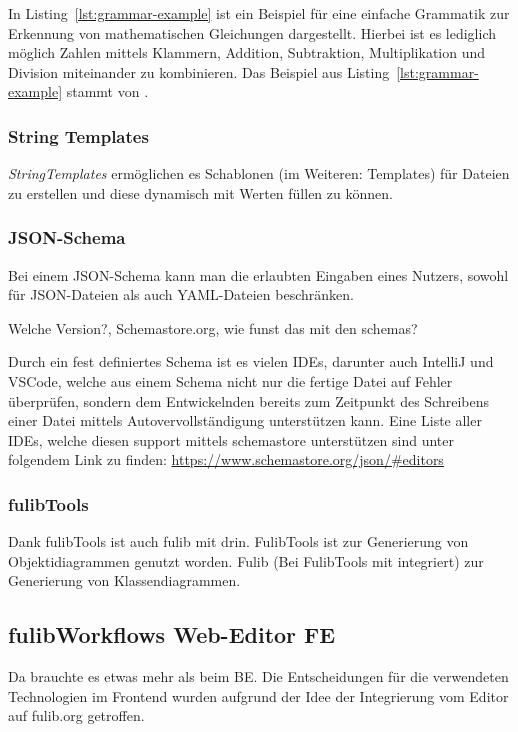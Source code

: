 

In Listing~\ref{lst:grammar-example} ist ein Beispiel für eine einfache Grammatik zur Erkennung von mathematischen Gleichungen dargestellt.
Hierbei ist es lediglich möglich Zahlen mittels Klammern, Addition, Subtraktion, Multiplikation und Division miteinander zu kombinieren.
Das Beispiel aus Listing~\ref{lst:grammar-example} stammt von \cite{antlrOrg}.

\subsubsection{String Templates}
\textit{StringTemplates} ermöglichen es Schablonen (im Weiteren: Templates) für Dateien zu erstellen und diese dynamisch mit Werten füllen zu können.


\subsubsection{JSON-Schema}\label{subsubsec:json-schema}
Bei einem JSON-Schema kann man die erlaubten Eingaben eines Nutzers, sowohl für JSON-Dateien als
auch YAML-Dateien beschränken.

\todo Welche Version?, Schemastore.org, wie funst das mit den schemas?

Durch ein fest definiertes Schema ist es vielen IDEs, darunter auch IntelliJ und VSCode, welche
aus einem Schema nicht nur die fertige Datei auf Fehler überprüfen, sondern dem Entwickelnden bereits
zum Zeitpunkt des Schreibens einer Datei mittels Autovervollständigung unterstützen kann.
Eine Liste aller IDEs, welche diesen support mittels schemastore unterstützen sind unter folgendem
Link zu finden: \url{https://www.schemastore.org/json/#editors}

\subsubsection{fulibTools}
\todo
Dank fulibTools ist auch fulib mit drin.
FulibTools ist zur Generierung von Objektidiagrammen genutzt worden.
Fulib (Bei FulibTools mit integriert) zur Generierung von Klassendiagrammen.

\subsection{fulibWorkflows Web-Editor FE}\label{subsec:fulibworkflows-web-editor}
\todo
Da brauchte es etwas mehr als beim BE\@.
Die Entscheidungen für die verwendeten Technologien im Frontend wurden aufgrund
der Idee der Integrierung vom Editor auf fulib.org getroffen.

